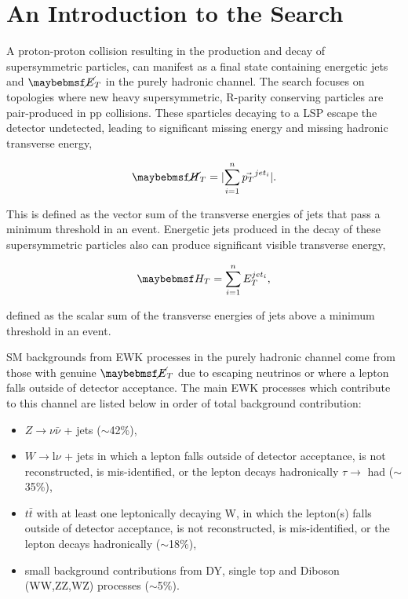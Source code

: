 \section{An Introduction to the \alphat Search}
\label{sec:alphatintroduction}

A proton-proton collision resulting in the production and decay of supersymmetric particles,  can manifest as a final state containing energetic jets and $\met$ in the purely hadronic channel. The search focuses on topologies where new heavy supersymmetric, R-parity conserving particles are pair-produced in pp collisions. These sparticles decaying to a \ac{LSP} escape the detector undetected, leading to significant missing energy and missing hadronic transverse energy,

\begin{equation}
\mht =  \lvert \sum_{i=1}^{n} \vec{p_{T}}^{jet_{i}} \rvert.
\end{equation}

This is defined as the vector sum of the transverse energies of jets that pass a minimum \pt threshold in an event. Energetic jets produced in the decay of these supersymmetric particles also can produce significant visible transverse energy, 

\begin{equation}
\theht = \sum_{i=1}^{n} E_{T}^{jet_{i}},
\end{equation}

defined as the scalar sum of the transverse energies of jets above a minimum \pt threshold in an event.

\ac{SM} backgrounds from \ac{EWK} processes in the purely hadronic channel come from those with genuine $\met$ due to escaping neutrinos or where a lepton falls outside of detector acceptance. The main \ac{EWK} processes which contribute to this channel are listed below in order of total background contribution:

\begin{itemize}
\item $Z\rightarrow\nu\bar{\nu}$ +  jets ($\sim$42\%),
\item $W\rightarrow\text{l}\nu$ + jets in which a lepton falls outside of detector acceptance, is not reconstructed, is mis-identified, or the lepton decays hadronically $\tau \rightarrow$ had ($\sim$35\%),
\item $t\bar{t}$ with at least one leptonically decaying W, in which the lepton(s) falls outside of detector acceptance, is not reconstructed, is mis-identified, or the lepton decays hadronically   ($\sim$18\%),
\item small background contributions from DY, single top and Diboson (WW,ZZ,WZ) processes ($\sim$5\%).
\end{itemize}

